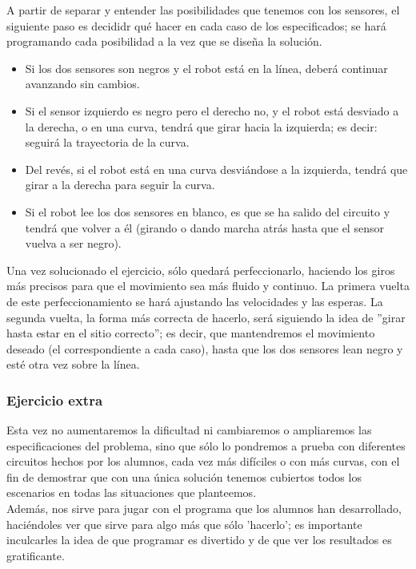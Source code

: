 A partir de separar y entender las posibilidades que tenemos con los sensores, el siguiente paso es decididr qué hacer en cada caso de los especificados; se hará programando cada posibilidad a la vez que se diseña la solución.
\begin{itemize}
	\item Si los dos sensores son negros y el robot está en la línea, deberá continuar avanzando sin cambios.
	\item Si el sensor izquierdo es negro pero el derecho no, y el robot está desviado a la derecha, o en una curva, tendrá que girar hacia la izquierda; es decir: seguirá la trayectoria de la curva.
	\item Del revés, si el robot está en una curva desviándose a la izquierda, tendrá que girar a la derecha para seguir la curva.
	\item Si el robot lee los dos sensores en blanco, es que se ha salido del circuito y tendrá que volver a él (girando o dando marcha atrás hasta que el sensor vuelva a ser negro).
\end{itemize}
Una vez solucionado el ejercicio, sólo quedará perfeccionarlo, haciendo los giros más precisos para que el movimiento sea más fluido y continuo. La primera vuelta de este perfeccionamiento se hará ajustando las velocidades y las esperas. La segunda vuelta, la forma más correcta de hacerlo, será siguiendo la idea de ''girar hasta estar en el sitio correcto''; es decir, que mantendremos el movimiento deseado (el correspondiente a cada caso), hasta que los dos sensores lean negro y esté otra vez sobre la línea.

\subsubsection{Ejercicio extra}
Esta vez no aumentaremos la dificultad ni cambiaremos o ampliaremos las especificaciones del problema, sino que sólo lo pondremos a prueba con diferentes circuitos hechos por los alumnos, cada vez más difíciles o con más curvas, con el fin de demostrar que con una única solución tenemos cubiertos todos los escenarios en todas las situaciones que planteemos. \\
Además, nos sirve para jugar con el programa que los alumnos han desarrollado, haciéndoles ver que sirve para algo más que sólo 'hacerlo'; es importante inculcarles la idea de que programar es divertido y de que ver los resultados es gratificante.

